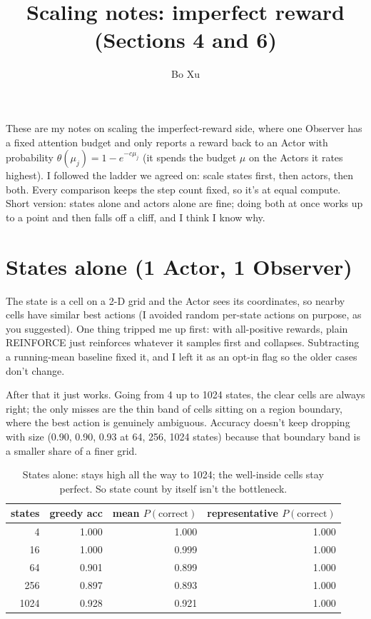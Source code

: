 \documentclass[11pt]{article}
\title{\textbf{Scaling notes: imperfect reward (Sections 4 and 6)}}
\author{Bo Xu}
\date{}
\begin{document}
\maketitle

These are my notes on scaling the imperfect-reward side, where one Observer has a
fixed attention budget and only reports a reward back to an Actor with probability
$\theta(\mu_j) = 1 - e^{-c\mu_j}$ (it spends the budget $\mu$ on the Actors it
rates highest). I followed the ladder we agreed on: scale states first, then
actors, then both. Every comparison keeps the step count fixed, so it's at equal
compute. Short version: states alone and actors alone are fine; doing both at once
works up to a point and then falls off a cliff, and I think I know why.

\section{States alone (1 Actor, 1 Observer)}

The state is a cell on a 2-D grid and the Actor sees its coordinates, so nearby
cells have similar best actions (I avoided random per-state actions on purpose, as
you suggested). One thing tripped me up first: with all-positive rewards, plain
REINFORCE just reinforces whatever it samples first and collapses. Subtracting a
running-mean baseline fixed it, and I left it as an opt-in flag so the older cases
don't change.

After that it just works. Going from 4 up to 1024 states, the clear cells are
always right; the only misses are the thin band of cells sitting on a region
boundary, where the best action is genuinely ambiguous. Accuracy doesn't keep
dropping with size (0.90, 0.90, 0.93 at 64, 256, 1024 states) because that
boundary band is a smaller share of a finer grid.

\begin{table}[H]
\centering
\begin{tabular}{rrrr}
\toprule
states & greedy acc & mean $P(\text{correct})$ & representative $P(\text{correct})$ \\
\midrule
4    & 1.000 & 1.000 & 1.000 \\
16   & 1.000 & 0.999 & 1.000 \\
64   & 0.901 & 0.899 & 1.000 \\
256  & 0.897 & 0.893 & 1.000 \\
1024 & 0.928 & 0.921 & 1.000 \\
\bottomrule
\end{tabular}
\caption{States alone: stays high all the way to 1024; the well-inside cells stay
perfect. So state count by itself isn't the bottleneck.}
\end{table}
\end{document}
